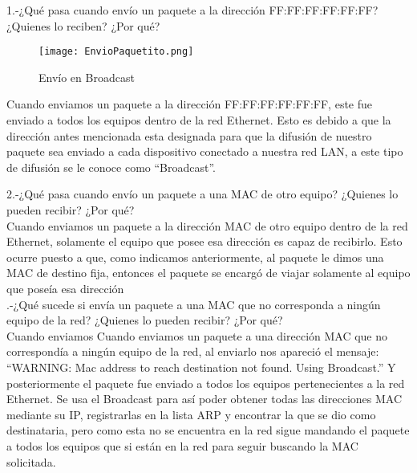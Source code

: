 \documentclass{udpreport}
\begin{document}
	  1.-¿Qué pasa cuando envío un paquete a la dirección FF:FF:FF:FF:FF:FF? ¿Quienes
	     lo reciben? ¿Por qué?\\
    	 	\begin{figure}[H]
	        	\centering
	        	\texttt{[image: EnvioPaquetito.png]}
			\caption{Envío en Broadcast}
	 	\end{figure}
	     Cuando enviamos un paquete a la dirección FF:FF:FF:FF:FF:FF, este fue enviado a todos los equipos dentro de la red
	     Ethernet. Esto es debido a que la dirección antes mencionada esta designada para que la difusión de nuestro paquete sea
 	     enviado a cada dispositivo conectado a nuestra red LAN, a este tipo de difusión se le conoce como “Broadcast”.\\
 	     \newpage
 
  	  2.-¿Qué pasa cuando envío un paquete a una MAC de otro equipo? ¿Quienes lo
  	      pueden recibir? ¿Por qué?\\
    		
 	      
 	      Cuando enviamos un paquete a la dirección MAC de otro equipo dentro de la red Ethernet, solamente el equipo que posee
 	      esa dirección es capaz de recibirlo. Esto ocurre puesto a que, como indicamos anteriormente, al paquete le dimos una
 	      MAC de destino fija, entonces el paquete se encargó de viajar solamente al equipo que poseía esa dirección\\
        .-¿Qué sucede si envía un paquete a una MAC que no corresponda a ningún equipo
  	      de la red? ¿Quienes lo pueden recibir? ¿Por qué?\\
    		
 	      Cuando enviamos 
 	      Cuando enviamos un paquete a una dirección MAC que no correspondía a ningún equipo de la red, al enviarlo nos apareció
 	      el mensaje: “WARNING: Mac address to reach destination not found. Using Broadcast.” Y posteriormente el paquete fue
 	      enviado a todos los equipos pertenecientes a la red Ethernet. Se usa el Broadcast para así poder obtener todas las
 	      direcciones MAC mediante su IP, registrarlas en la lista ARP y encontrar la que se dio como destinataria, pero como esta
 	      no se encuentra en la red sigue mandando el paquete a todos los equipos que si están en la red para seguir buscando la
 	      MAC solicitada.\\

 	     
	      
\end{document}
